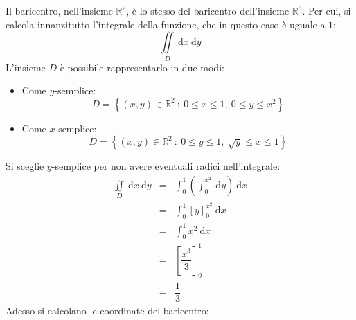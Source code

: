 \documentclass[a4paper]{article}
\begin{document}
	\noindent
	Il baricentro, nell'insieme $\mathbb{R}^{2}$, è lo stesso del baricentro dell'insieme $\mathbb{R}^{3}$. Per cui, si calcola innanzitutto l'integrale della funzione, che in questo caso è uguale a $1$:
	\begin{equation*}
		\displaystyle\iint\limits_{D} \:\mathrm{d}x\:\mathrm{d}y
	\end{equation*}
	L'insieme $D$ è possibile rappresentarlo in due modi:
	\begin{itemize}
		\item Come $y$-semplice:
		\begin{equation*}
			D = \left\{\left(x,y\right) \in \mathbb{R}^{2} \: : \: 0 \le x \le 1, \: 0 \le y \le x^{2}\right\}
		\end{equation*}

		\item Come $x$-semplice:
		\begin{equation*}
			D = \left\{\left(x,y\right) \in \mathbb{R}^{2} \: : \: 0 \le y \le 1, \: \sqrt{y} \le x \le 1\right\}
		\end{equation*}
	\end{itemize}
	Si sceglie $y$-semplice per non avere eventuali radici nell'integrale:
	\begin{equation*}
		\begin{array}{rcl}
			\displaystyle\iint\limits_{D} \:\mathrm{d}x\:\mathrm{d}y 
			&=&
			\displaystyle\int_{0}^{1} \left(\int_{0}^{x^{2}} \:\mathrm{d}y\right) \:\mathrm{d}x \\ [1.5em]
			&=&
			\displaystyle\int_{0}^{1} \left[y\right]_{0}^{x^{2}} \:\mathrm{d}x \\ [1.5em]
			&=&
			\displaystyle\int_{0}^{1} x^{2} \:\mathrm{d}x \\ [1.5em]
			&=&
			\left[\dfrac{x^{3}}{3}\right]_{0}^{1}\\ [1.5em]
			&=&
			\dfrac{1}{3}
		\end{array}
	\end{equation*}
	Adesso si calcolano le coordinate del baricentro:
\end{document}
